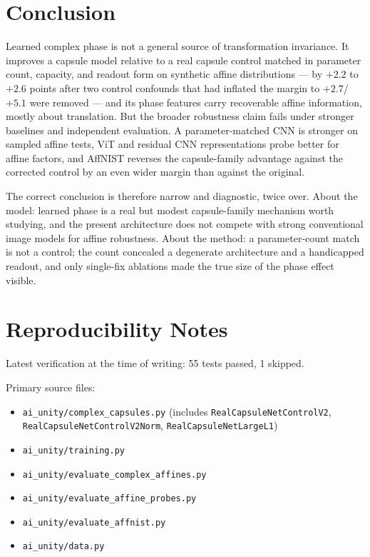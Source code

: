 \documentclass[11pt]{article}
\begin{document}
\section{Conclusion}
Learned complex phase is not a general source of transformation invariance. It improves a capsule model relative to a real capsule control matched in parameter count, capacity, and readout form on synthetic affine distributions --- by $+2.2$ to $+2.6$ points after two control confounds that had inflated the margin to $+2.7$/$+5.1$ were removed --- and its phase features carry recoverable affine information, mostly about translation. But the broader robustness claim fails under stronger baselines and independent evaluation. A parameter-matched CNN is stronger on sampled affine tests, ViT and residual CNN representations probe better for affine factors, and AffNIST reverses the capsule-family advantage against the corrected control by an even wider margin than against the original.

The correct conclusion is therefore narrow and diagnostic, twice over. About the model: learned phase is a real but modest capsule-family mechanism worth studying, and the present architecture does not compete with strong conventional image models for affine robustness. About the method: a parameter-count match is not a control; the count concealed a degenerate architecture and a handicapped readout, and only single-fix ablations made the true size of the phase effect visible.

\section{Reproducibility Notes}
Latest verification at the time of writing: 55 tests passed, 1 skipped.

Primary source files:
\begin{itemize}
  \item \texttt{ai\_unity/complex\_capsules.py} (includes \texttt{RealCapsuleNetControlV2}, \texttt{RealCapsuleNetControlV2Norm}, \texttt{RealCapsuleNetLargeL1})
  \item \texttt{ai\_unity/training.py}
  \item \texttt{ai\_unity/evaluate\_complex\_affines.py}
  \item \texttt{ai\_unity/evaluate\_affine\_probes.py}
  \item \texttt{ai\_unity/evaluate\_affnist.py}
  \item \texttt{ai\_unity/data.py}
\end{itemize}
\end{document}
